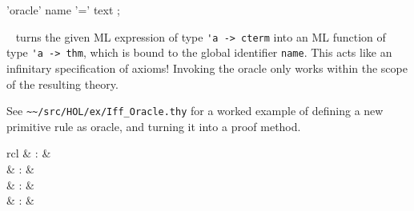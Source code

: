 \begin{isabellebody}
\begin{isamarkuptext}
  \begin{rail}
    'oracle' name '=' text
    ;
  \end{rail}

  \begin{description}

  \item \hyperlink{command.oracle}{\mbox{}}~ turns the given ML
  expression  of type \verb|'a -> cterm| into an
  ML function of type \verb|'a -> thm|, which is bound to the
  global identifier \verb|name|.  This acts like an infinitary
  specification of axioms!  Invoking the oracle only works within the
  scope of the resulting theory.

  \end{description}

  See \verb|~~/src/HOL/ex/Iff_Oracle.thy| for a worked example of
  defining a new primitive rule as oracle, and turning it into a proof
  method.%
\end{isamarkuptext}%
\isamarkuptrue%
%
\isamarkuptrue%
%
\begin{isamarkuptext}%
\begin{matharray}{rcl}
    \hypertarget{command.hide-class}{\hyperlink{command.hide-class}{\mbox{}}} & : &  \\
    \hypertarget{command.hide-type}{\hyperlink{command.hide-type}{\mbox{}}} & : &  \\
    \hypertarget{command.hide-const}{\hyperlink{command.hide-const}{\mbox{}}} & : &  \\
    \hypertarget{command.hide-fact}{\hyperlink{command.hide-fact}{\mbox{}}} & : &  \\
  \end{matharray}


\end{isamarkuptext}
\end{isabellebody}
